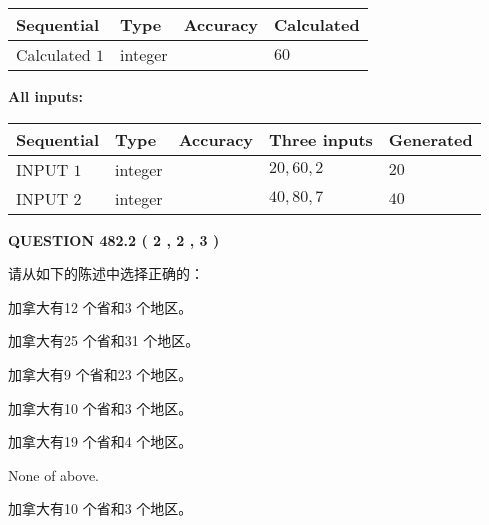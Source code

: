 \documentclass{ctexart}
\begin{document}
  
\noindent\begin{tabular}{|l|l|l|l|}
\hline
 Sequential & Type & Accuracy & Calculated \\ 
\hline
 
 
  Calculated $  1 $ & integer &  & 
  $ 60 $ 
 \\  \hline  
 \end{tabular}
   
   
   
   
\noindent\vspace{0.1in}\hspace{-0.08in} {\textbf{\Large{All inputs: }}}
   
   
  
  
\noindent\begin{tabular}{|l|l|l|l|l|}
\hline
 Sequential & Type & Accuracy & Three inputs & Generated \\ 
\hline
 
 
  INPUT $  1 $ & integer &  & $
 20
 , 
 60
 , 
 2
 $ & $ 20 $ 
 \\  \hline  
 
 
  INPUT $  2 $ & integer &  & $
 40
 , 
 80
 , 
 7
 $ & $ 40 $ 
 \\  \hline  
 \end{tabular}
   
   
  
\vspace{0.2in}
  
{\textbf{\Large{QUESTION
482.2 
 ( 2 , 2 , 3 )
}}}
  
  
请从如下的陈述中选择正确的：
 
 
加拿大有12 个省和3 个地区。
 
 
加拿大有25 个省和31 个地区。
 
 
加拿大有9 个省和23 个地区。
 
 
加拿大有10 个省和3 个地区。
 
 
加拿大有19 个省和4 个地区。
 
 
 None of above.
 
 
\noindent{}
 
 
加拿大有10 个省和3 个地区。
 
 
\noindent{}
 
\end{document}
